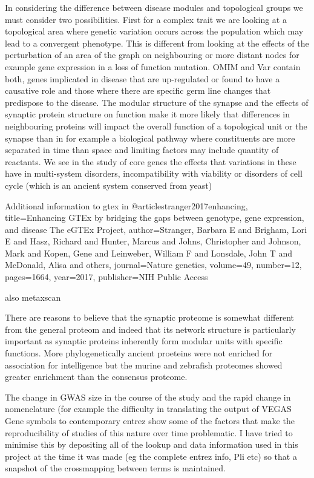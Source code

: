 In considering the difference between disease modules and topological groups we must consider two possibilities. First for a complex trait we are looking at a topological area where genetic variation occurs across the population which may lead to a convergent phenotype. This is different from looking at the effects of the perturbation of an area of the graph on neighbouring or more distant nodes for example gene expression in a loss of function mutation. OMIM and Var contain both, genes implicated in disease that are up-regulated or found to have a causative role and those where there are specific germ line changes that predispose to the disease. The modular structure of the synapse and the effects of synaptic protein structure on function make it more likely that differences in neighbouring proteins will impact the overall function of a topological unit or the synapse than in for example a biological pathway where constituents are more separated in time than space and limiting factors may include quantity of reactants. We see in the study of core genes the effects that variations in these have in multi-system disorders, incompatibility with viability or disorders of cell cycle (which is an ancient system conserved from yeast)



Additional information to gtex in
@article{stranger2017enhancing,
  title={Enhancing GTEx by bridging the gaps between genotype, gene expression, and disease The eGTEx Project},
  author={Stranger, Barbara E and Brigham, Lori E and Hasz, Richard and Hunter, Marcus and Johns, Christopher and Johnson, Mark and Kopen, Gene and Leinweber, William F and Lonsdale, John T and McDonald, Alisa and others},
  journal={Nature genetics},
  volume={49},
  number={12},
  pages={1664},
  year={2017},
  publisher={NIH Public Access}
}

also metaxscan


There are reasons to believe that the synaptic proteome is somewhat different from the general proteom and indeed that its network structure is particularly important as synaptic proteins inherently form modular units with specific functions. More phylogenetically ancient proeteins were not enriched for association for intelligence but the murine and zebrafish proteomes showed greater enrichment than the consensus proteome.

The change in GWAS size in the course of the study and the rapid change in nomenclature (for example the difficulty in translating the output of VEGAS Gene symbols to contemporary entrez show some of the factors that make the reproducibility of studies of this nature over time problematic. I have tried to minimise this by depositing all of the lookup and data information used in this project at the time it was made (eg the complete entrez info, Pli etc) so that a snapshot of the crossmapping between terms is maintained.

